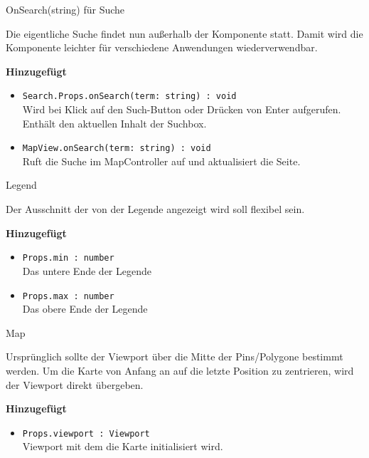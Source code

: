 \begin{Change}{OnSearch(string) für Suche}
    
    Die eigentliche Suche findet nun außerhalb der Komponente statt.
    Damit wird die Komponente leichter für verschiedene Anwendungen wiederverwendbar.

    \bigskip
    \textbf{Hinzugefügt}
    \begin{itemize}
        \item \texttt{Search.Props.onSearch(term: string) : void}
        \\ Wird bei Klick auf den Such-Button oder Drücken von Enter aufgerufen.
        Enthält den aktuellen Inhalt der Suchbox. 
        \item \texttt{MapView.onSearch(term: string) : void}
        \\ Ruft die Suche im MapController auf und aktualisiert die Seite.
    \end{itemize}

\end{Change}

\begin{Change}{Legend}
    
    Der Ausschnitt der von der Legende angezeigt wird soll flexibel sein.

    \bigskip
    \textbf{Hinzugefügt}
    \begin{itemize}
        \item \texttt{Props.min : number}
        \\ Das untere Ende der Legende
        \item \texttt{Props.max : number}
        \\ Das obere Ende der Legende
    \end{itemize}

\end{Change}

\begin{Change}{Map}
    
    Ursprünglich sollte der Viewport über die Mitte der Pins/Polygone bestimmt werden.
    Um die Karte von Anfang an auf die letzte Position zu zentrieren, wird der Viewport direkt übergeben.
    
    \bigskip
    \textbf{Hinzugefügt}
    \begin{itemize}
        \item \texttt{Props.viewport : Viewport}
        \\ Viewport mit dem die Karte initialisiert wird.
    \end{itemize}

\end{Change}


